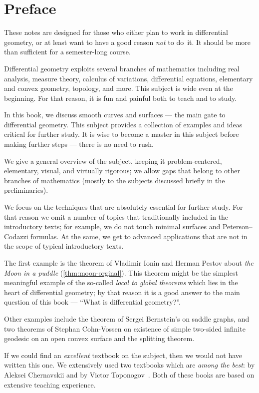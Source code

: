 
\chapter*{Preface}

These notes are designed for those who either plan to work in differential geometry,
or at least want to have a good reason \emph{not} to do~it.
It should be more than sufficient for a semester-long course. 

Differential geometry exploits several branches of mathematics including 
real analysis, 
measure theory,
calculus of variations,
differential equations,
elementary and convex geometry,
topology, and more.
This subject is wide even at the beginning. 
For that reason, it is fun and painful both to teach and to study.

In this book, we discuss smooth curves and surfaces --- the main gate to differential geometry.
This subject provides a collection of examples and ideas critical for further study.
It is wise to become a master in this subject before making further steps --- there is no need to rush.

We give a general overview of the subject, keeping it
problem-centered,
elementary, 
visual, 
and virtually rigorous; we allow gaps that belong to other branches of mathematics (mostly to the subjects discussed briefly in the preliminaries).

We focus on the techniques that are absolutely essential for further study.
For  that reason we omit a number of topics that traditionally included in the introductory texts;
for example, we do not touch %
minimal surfaces and Peterson--Codazzi formulas.
At the same, we get to advanced applications
 that are not in the scope of typical introductory texts.
 
The first example is the theorem of Vladimir Ionin and Herman Pestov about \emph{the Moon in a puddle} (\ref{thm:moon-orginal}).
This theorem might be the simplest meaningful example of the so-called {}\emph{local to global theorems} which lies in the heart of differential geometry;
by that reason it is a good answer to the main question of this book --- ``What is differential geometry?''.

Other examples include the theorem of Sergei Bernstein's on saddle graphs, and two theorems of Stephan Cohn-Vossen on existence of simple two-sided infinite geodesic on an open convex surface and the splitting theorem.

If we could find an \emph{excellent} textbook on the subject, then we would not have written this one.
We extensively used two textbooks which are \emph{among the best}: by Aleksei Chernavskii \cite{chernavsky} and by Victor Toponogov~\cite{toponogov-book}.
Both of these books are based on extensive teaching experience.


